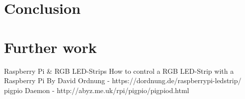 \documentclass[conference]{IEEEtran}
\begin{document}
\section{Conclusion}


\section{Further work}



\begin{thebibliography}{00}
 Raspberry Pi \& RGB LED-Strips How to control a RGB LED-Strip with a Raspberry Pi By David Ordnung - https://dordnung.de/raspberrypi-ledstrip/
 pigpio Daemon - http://abyz.me.uk/rpi/pigpio/pigpiod.html

\end{thebibliography}
\vspace{12pt}
\end{document}
